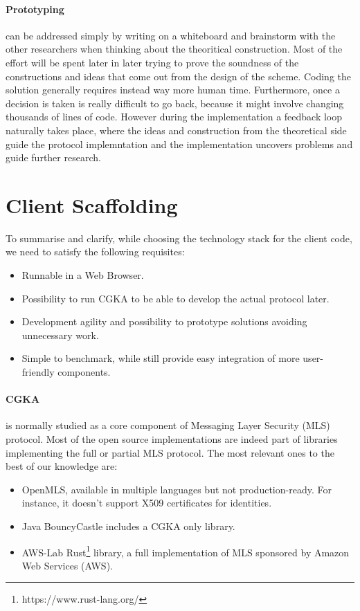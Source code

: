 \paragraph{Prototyping} can be addressed simply by writing on a whiteboard and brainstorm with the other researchers when thinking about the theoritical construction. 
Most of the effort will be spent later in later trying to prove the soundness of the constructions and ideas that come out from the design of the scheme.  
Coding the solution generally requires instead way more human time.
Furthermore, once a decision is taken is really difficult to go back, because it might involve changing thousands of lines of code.
However during the implementation a feedback loop naturally takes place, where the ideas and construction from the theoretical side guide the protocol implemntation and the implementation uncovers problems and guide further research.

\section{Client Scaffolding}
To summarise and clarify, while choosing the technology stack for the client code, we need to satisfy the following requisites:
\begin{itemize}
    \item Runnable in a Web Browser.
    \item Possibility to run CGKA to be able to develop the actual protocol later.
    \item Development agility and possibility to prototype solutions avoiding unnecessary work.
    \item Simple to benchmark, while still provide easy integration of more user-friendly components.
\end{itemize}

\paragraph{CGKA} is normally studied as a core component of Messaging Layer Security (MLS) protocol.
Most of the open source implementations are indeed part of libraries implementing the full or partial MLS protocol.
The most relevant ones to the best of our knowledge are:
\begin{itemize}
    \item OpenMLS, available in multiple languages but not production-ready. For instance, it doesn't support X509 certificates for identities.
    \item Java BouncyCastle includes a CGKA only library.
    \item AWS-Lab Rust\footnote{https://www.rust-lang.org/} library, a full implementation of MLS sponsored by Amazon Web Services (AWS). 
\end{itemize}


